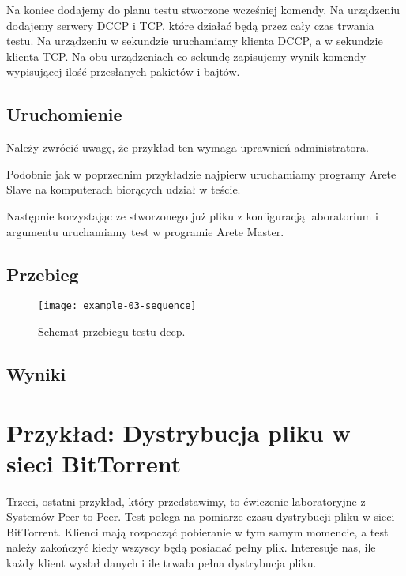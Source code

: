 \documentclass[00-praca-magisterska.tex]{subfiles}
\begin{document}
Na koniec dodajemy do planu testu stworzone wcześniej komendy. Na urządzeniu
 dodajemy serwery DCCP i TCP, które działać będą przez cały czas
trwania testu. Na urządzeniu  w  sekundzie uruchamiamy
klienta DCCP, a w  sekundzie klienta TCP. Na obu urządzeniach co
sekundę zapisujemy wynik komendy wypisującej ilość przesłanych pakietów i
bajtów.

\subsection{Uruchomienie}

Należy zwrócić uwagę, że przykład ten wymaga uprawnień administratora.

Podobnie jak w poprzednim przykładzie najpierw uruchamiamy programy Arete Slave
na komputerach biorących udział w teście.


Następnie korzystając ze stworzonego już pliku z konfiguracją laboratorium i
argumentu  uruchamiamy test w programie Arete Master.


\subsection{Przebieg}


\begin{figure}[htb]
\begin{center}
\leavevmode
\texttt{[image: example-03-sequence]}
\end{center}
\caption{Schemat przebiegu testu dccp.}
\label{fig:example-03-sequence}
\end{figure}

\subsection{Wyniki}


\section{Przykład: Dystrybucja pliku w sieci BitTorrent}

Trzeci, ostatni przykład, który przedstawimy, to ćwiczenie laboratoryjne z
Systemów Peer-to-Peer. Test polega na pomiarze czasu dystrybucji pliku w sieci
BitTorrent. Klienci mają rozpocząć pobieranie w tym samym momencie, a test należy
zakończyć kiedy wszyscy będą posiadać pełny plik. Interesuje nas, ile każdy
klient wysłał danych i ile trwała pełna dystrybucja pliku.
\end{document}
